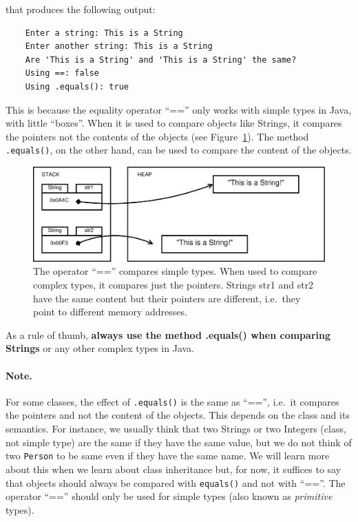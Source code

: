 that produces the following output: 

\begin{verbatim}
    Enter a string: This is a String
    Enter another string: This is a String
    Are 'This is a String' and 'This is a String' the same?
    Using ==: false
    Using .equals(): true
\end{verbatim}

This is because the equality operator ``=='' only works with simple
types in Java, with little ``boxes''. When it is used to compare objects like
Strings, it compares the pointers not the contents of the objects (see
Figure~\ref{fig:equals}). The
method \verb+.equals()+, on the other hand, can be used to compare the
content of the objects. 

\begin{figure}[bthp]
  \centering
  \includegraphics[width=\textwidth]{gfx/variables-string-equals}
  \caption{The operator ``=='' compares simple types. When used to
    compare complex types, it compares just the pointers. Strings str1
  and str2 have the same content but their pointers are different,
  i.e.~they point to different memory addresses.} 
  \label{fig:equals}
\end{figure}

As a rule of thumb, \textbf{always use the method .equals()
  when comparing Strings} or any other complex types in Java.

\paragraph{Note.}
\label{sec:notre}

For some classes, the effect of \verb+.equals()+ is the same as
``=='', i.e.~it compares the pointers and not the content of the
objects. This depends on the class and its semantics. For instance,
we usually think that two Strings or two Integers (class, not simple
type) are the same if they have the same value, but we do not think
of two \verb+Person+ to be same even if they have the same name. We
will learn more about this when we learn about class inheritance but,
for now, it suffices to say that objects should always be compared
with \verb+equals()+ and not with ``==''. The operator ``=='' should
only be used for simple types (also known as \emph{primitive} types). 

